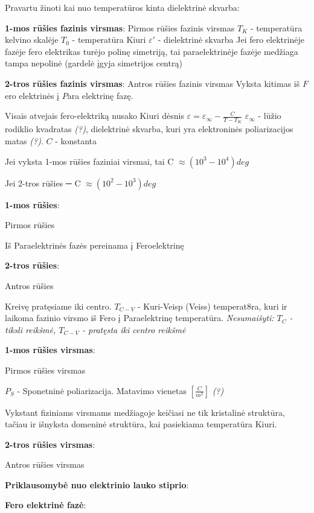 Pravartu žinoti kai nuo temperatūros kinta dielektrinė skvarba:

\textbf{1-mos rūšies fazinis virsmas}:
{Pirmos rūšies fazinis virsmas}
$T_K$ - temperatūra kelvino skalėje
$T_0$ - temperatūra Kiuri
$\varepsilon'$ - dielektrinė skvarba
Jei fero elektrinėje fazėje fero elektrikas turėjo polinę simetriją,
tai paraelektrinėje fazėje medžiaga tampa nepolinė
(gardelė įgyja simetrijos centrą)

\textbf{2-tros rūšies fazinis virsmas}:
{Antros rūšies fazinis virsmas}
Vyksta kitimas iš $F$ero elektrinės į $P$ara elektrinę fazę.

Visais atvejais fero-elektriką nusako Kiuri dėsnis
$\varepsilon = \varepsilon_{\infty} - \frac{C}{T - T_K}$
$\varepsilon_{\infty}$ - lūžio rodiklio kvadratas \textit{(?)},
dielektrinė skvarba, kuri yra elektroninės poliarizacijos matas \textit{(?)}.
$C$ - konstanta

Jei vyksta 1-mos rūšies faziniai virsmai,
tai C $\approx (10^3 - 10^4) deg$

Jei 2-tros rūšies ─ C $\approx (10^2 - 10^3) deg$

\textbf{1-mos rūšies}:

{Pirmos rūšies}

Iš Paraelektrinės fazės pereinama į Feroelektrinę

\textbf{2-tros rūšies}:

{Antros rūšies}

Kreivę pratęsiame iki centro.
$T_{C-V}$ - Kuri-Veisp (Veiss) temperat8ra, kuri ir laikoma fazinio virsmo
iš Fero į Paraelektrinę temperatūra.
\textit{Nesumaišyti: $T_C$ - tiksli reikšmė, $T_{C-V}$ - pratęsta iki centro reikšmė}

\textbf{1-mos rūšies virsmas}:

{Pirmos rūšies virsmas}

$P_S$ - Sponetninė poliarizacija. Matavimo vienetas $[\frac{C}{m^2}]$ \textit{(?)}

Vykstant fiziniams virsmams medžiagoje keičiasi ne tik kristalinė struktūra,
tačiau ir išnyksta domeninė struktūra, kai pasiekiama temperatūra Kiuri.

\textbf{2-tros rūšies virsmas}:

{Antros rūšies virsmas}

\textbf{Priklausomybė nuo elektrinio lauko stiprio}:

\textbf{Fero elektrinė fazė}:

